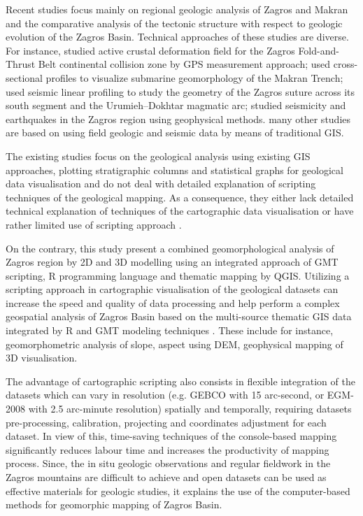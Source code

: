 \documentclass[12pt,a4paper,oneside]{article}
\begin{document}
Recent studies focus mainly on regional geologic analysis of Zagros and Makran and the comparative analysis of the tectonic structure with respect to geologic evolution of the Zagros Basin. Technical approaches of these studies are diverse. For instance, \cite{Palano,Bayer,Masson} studied active crustal deformation field for the Zagros Fold-and-Thrust Belt continental collision zone by GPS measurement approach; \cite{Lemenkova2020a} used cross-sectional profiles to visualize submarine geomorphology of the Makran Trench; \cite{Motaghi} used seismic linear profiling to study the geometry of the Zagros suture across its south segment and the Urumieh–Dokhtar magmatic arc; \cite{Adams,Massonetal2005} studied seismicity and earthquakes in the Zagros region using geophysical methods. many other studies are based on using field geologic and seismic data by means of traditional GIS. 

The existing studies focus on the geological analysis using existing GIS approaches, plotting stratigraphic columns and statistical graphs for geological data visualisation \cite{Mouthereau,Koshnaw,Suetova} and do not deal with detailed explanation of scripting techniques of the geological mapping. As a consequence, they either lack detailed technical explanation of techniques of the cartographic data visualisation \cite{Tavani} or have rather limited use of scripting approach \cite{Lemenkova2020b}. 

On the contrary, this study present a combined geomorphological analysis of Zagros region by 2D and 3D modelling using an integrated approach of GMT scripting, R programming language and thematic mapping by QGIS. Utilizing a scripting approach in cartographic visualisation of the geological datasets can increase the speed and quality of data processing and help perform a complex geospatial analysis of Zagros Basin based on the multi-source thematic GIS data integrated by R and GMT modeling techniques \cite{Lemenkova2019a}. These include for instance, geomorphometric analysis of slope, aspect using DEM, geophysical mapping of 3D visualisation. 

The advantage of cartographic scripting also consists in flexible integration of the datasets which can vary in resolution (e.g. GEBCO with 15 arc-second, or EGM-2008 with 2.5 arc-minute resolution) spatially and temporally, requiring datasets pre-processing, calibration, projecting and coordinates adjustment for each dataset. In view of this, time-saving techniques of the console-based mapping significantly reduces labour time and increases the productivity of mapping process.  Since, the in situ geologic observations and regular fieldwork in the Zagros mountains are difficult to achieve and open datasets can be used as effective materials for geologic studies, it explains the use of the computer-based methods for geomorphic mapping of Zagros Basin. 
\end{document}
